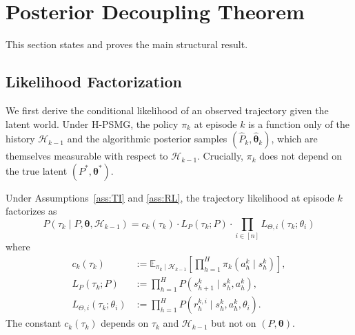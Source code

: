 \section{Posterior Decoupling Theorem}
\label{sec:decoupling}

This section states and proves the main structural result.

\subsection{Likelihood Factorization}

We first derive the conditional likelihood of an observed trajectory given the latent world. Under H-PSMG, the policy $\pi_k$ at episode $k$ is a function only of the history $\mathcal{H}_{k-1}$ and the algorithmic posterior samples $(\hat{P}_k, \hat{\boldsymbol{\theta}}_k)$, which are themselves measurable with respect to $\mathcal{H}_{k-1}$. Crucially, $\pi_k$ does not depend on the true latent $(P^*, \boldsymbol{\theta}^*)$.

\begin{lemma}
\label{lem:likelihood}
Under Assumptions~\ref{ass:TI} and \ref{ass:RL}, the trajectory likelihood at episode $k$ factorizes as
\begin{equation}
\label{eq:lik-factor}
P(\tau_k \mid P, \boldsymbol{\theta}, \mathcal{H}_{k-1}) = c_k(\tau_k) \cdot L_P(\tau_k; P) \cdot \prod_{i \in [n]} L_{\Theta,i}(\tau_k; \theta_i)
\end{equation}
where
\begin{align}
c_k(\tau_k) &:= \mathbb{E}_{\pi_k \mid \mathcal{H}_{k-1}}\left[\prod_{h=1}^H \pi_k(a_h^k \mid s_h^k)\right], \label{eq:ck} \\
L_P(\tau_k; P) &:= \prod_{h=1}^H P(s_{h+1}^k \mid s_h^k, a_h^k), \label{eq:lp} \\
L_{\Theta,i}(\tau_k; \theta_i) &:= \prod_{h=1}^H P(r_h^{k,i} \mid s_h^k, a_h^k, \theta_i). \label{eq:ltheta}
\end{align}
The constant $c_k(\tau_k)$ depends on $\tau_k$ and $\mathcal{H}_{k-1}$ but not on $(P, \boldsymbol{\theta})$.
\end{lemma}

